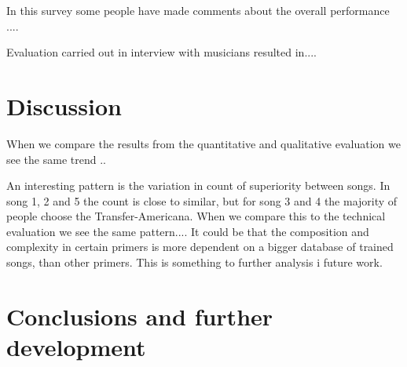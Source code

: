 \documentclass{IEEEtran}
\begin{document}
        In this survey some people have made comments about the overall performance ....

        Evaluation carried out in interview with musicians resulted in.... %

    \section{Discussion}
    When we compare the results from the quantitative and qualitative evaluation we see the same trend ..

    An interesting pattern is the variation in count of superiority between songs. In song 1, 2 and 5 the count is close to similar, but for song 3 and 4 the majority of people choose the Transfer-Americana. When we compare this to the technical evaluation we see the same pattern.... It could be that the composition and complexity in certain primers is more dependent on a bigger database of trained songs, than other primers. This is something to further analysis i future work.

    
    \section{Conclusions and further development}

    \vfill
    \pagebreak
    \printbibliography
\end{document}
